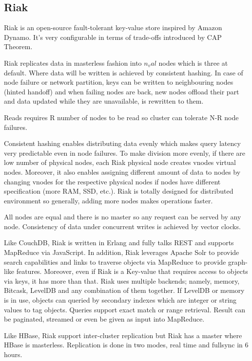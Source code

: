 \subsection{Riak}

Riak is an open-source fault-tolerant key-value store inspired by Amazon Dynamo. It's very configurable in terms of trade-offs introduced by CAP Theorem.

Riak replicates data in masterless fashion into $n_val$ nodes which is three at default. Where data will be written is achieved by consistent hashing. In case of node failure or network partition, keys can be written to neighbouring nodes (hinted handoff) and when failing nodes are back, new nodes offload their part and data updated while they are unavailable, is rewritten to them.

Reads requires R number of nodes to be read so cluster can tolerate N-R node failures.

Consistent hashing enables distributing data evenly which makes query latency very predictable even in node failures. To make division more evenly, if there are low number of physical nodes, each Riak physical node creates vnodes virtual nodes. Moreover, it also enables assigning different amount of data to nodes by changing vnodes for the respective physical nodes if nodes have different specification (more RAM, SSD, etc.). Riak is totally designed for distributed environment so generally, adding more nodes makes operations faster.

All nodes are equal and there is no master so any request can be served by any node. Consistency of data under concurrent writes is achieved by vector clocks.

Like CouchDB, Riak is written in Erlang and fully talks REST and supports MapReduce via JavaScript. In addition, Riak leverages Apache Solr to provide search capabilities and links to traverse objects via MapReduce to provide graph-like features. Moreover, even if Riak is a Key-value that requires access to objects via keys, it has more than that. Riak uses multiple backends; namely, memory, Bitcask, LevelDB and any combination of them together. If LevelDB or memory is in use, objects can queried by secondary indexes which are integer or string values to tag objects. Queries support exact match or range retrieval. Result can be paginated, streamed or even be given as input into MapReduce.

Like HBase, Riak support inter-cluster replication but Riak has a master where HBase is masterless. Replication is done in two modes, real time and fullsync in 6 hours.

